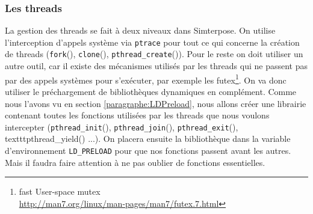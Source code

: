 \subsubsection{Les threads}

La gestion des threads se fait à deux niveaux dans Simterpose. On utilise l'interception d'appels système via \texttt{ptrace} pour tout ce qui concerne la création de threads (\texttt{fork}(), \texttt{clone}(), \texttt{pthread\_create}()). Pour le reste on doit utiliser un autre outil, car il existe des mécanismes utilisés par les threads qui ne passent pas par des appels systèmes pour s'exécuter, par exemple les futex\footnote{fast User-space mutex \\ \url{http://man7.org/linux/man-pages/man7/futex.7.html}}. On va donc utiliser le préchargement de bibliothèques dynamiques en complément. Comme nous l'avons vu en section \ref{paragraphe:LDPreload}, nous allons créer une librairie contenant toutes les fonctions utilisées par les threads que nous voulons intercepter (\texttt{pthread\_init}(), \texttt{pthread\_join}(), \texttt{pthread\_exit}(), texttt{pthread\_yield}() ...). On placera ensuite la bibliothèque dans la variable d'environnement \texttt{LD\_PRELOAD} pour que nos fonctions passent avant les autres. Mais il faudra faire attention à ne pas oublier de fonctions essentielles.



